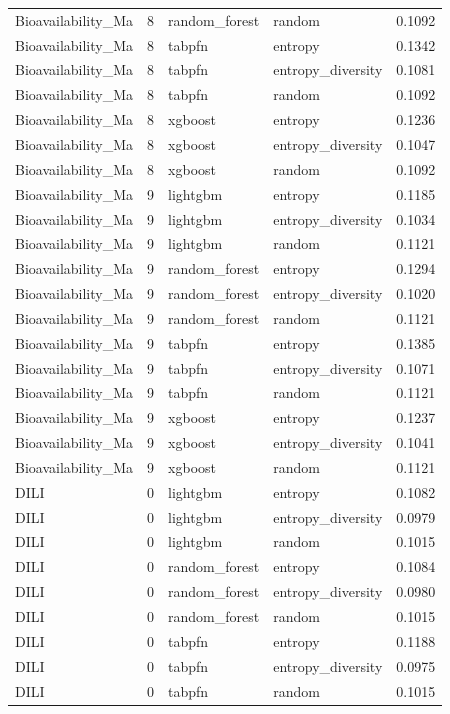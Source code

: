 \begin{tabular}{lrllr}
Bioavailability_Ma & 8 & random_forest & random & 0.1092 \\
Bioavailability_Ma & 8 & tabpfn & entropy & 0.1342 \\
Bioavailability_Ma & 8 & tabpfn & entropy_diversity & 0.1081 \\
Bioavailability_Ma & 8 & tabpfn & random & 0.1092 \\
Bioavailability_Ma & 8 & xgboost & entropy & 0.1236 \\
Bioavailability_Ma & 8 & xgboost & entropy_diversity & 0.1047 \\
Bioavailability_Ma & 8 & xgboost & random & 0.1092 \\
Bioavailability_Ma & 9 & lightgbm & entropy & 0.1185 \\
Bioavailability_Ma & 9 & lightgbm & entropy_diversity & 0.1034 \\
Bioavailability_Ma & 9 & lightgbm & random & 0.1121 \\
Bioavailability_Ma & 9 & random_forest & entropy & 0.1294 \\
Bioavailability_Ma & 9 & random_forest & entropy_diversity & 0.1020 \\
Bioavailability_Ma & 9 & random_forest & random & 0.1121 \\
Bioavailability_Ma & 9 & tabpfn & entropy & 0.1385 \\
Bioavailability_Ma & 9 & tabpfn & entropy_diversity & 0.1071 \\
Bioavailability_Ma & 9 & tabpfn & random & 0.1121 \\
Bioavailability_Ma & 9 & xgboost & entropy & 0.1237 \\
Bioavailability_Ma & 9 & xgboost & entropy_diversity & 0.1041 \\
Bioavailability_Ma & 9 & xgboost & random & 0.1121 \\
DILI & 0 & lightgbm & entropy & 0.1082 \\
DILI & 0 & lightgbm & entropy_diversity & 0.0979 \\
DILI & 0 & lightgbm & random & 0.1015 \\
DILI & 0 & random_forest & entropy & 0.1084 \\
DILI & 0 & random_forest & entropy_diversity & 0.0980 \\
DILI & 0 & random_forest & random & 0.1015 \\
DILI & 0 & tabpfn & entropy & 0.1188 \\
DILI & 0 & tabpfn & entropy_diversity & 0.0975 \\
DILI & 0 & tabpfn & random & 0.1015 \\

\end{tabular}
